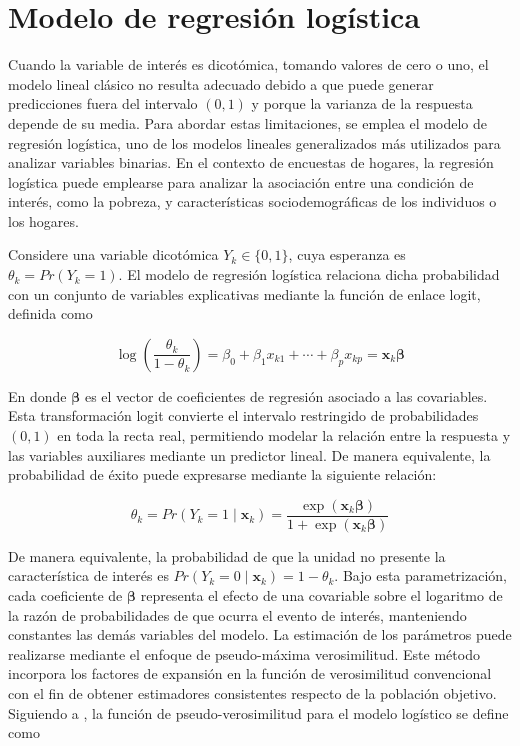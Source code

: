 \documentclass[
  spanish,
  12pt,
]{book}
\begin{document}
\section{Modelo de regresión logística}\label{sec-logistica}

Cuando la variable de interés es dicotómica, tomando valores de cero o uno, el modelo lineal clásico no resulta adecuado debido a que puede generar predicciones fuera del intervalo \((0,1)\) y porque la varianza de la respuesta depende de su media. Para abordar estas limitaciones, se emplea el modelo de regresión logística, uno de los modelos lineales generalizados más utilizados para analizar variables binarias. En el contexto de encuestas de hogares, la regresión logística puede emplearse para analizar la asociación entre una condición de interés, como la pobreza, y características sociodemográficas de los individuos o los hogares.

Considere una variable dicotómica \(Y_k \in \{0,1\}\), cuya esperanza es \(\theta_k=Pr(Y_k=1)\). El modelo de regresión logística relaciona dicha probabilidad con un conjunto de variables explicativas mediante la función de enlace logit, definida como

\[
\log\left(\frac{\theta_k}{1-\theta_k}\right)
=
\beta_0+\beta_1x_{k1}+\cdots+\beta_px_{kp}
=\mathbf{x}_{k}\boldsymbol{\beta}
\]

En donde \(\boldsymbol{\beta}\) es el vector de coeficientes de regresión asociado a las covariables. Esta transformación logit convierte el intervalo restringido de probabilidades \((0,1)\) en toda la recta real, permitiendo modelar la relación entre la respuesta y las variables auxiliares mediante un predictor lineal. De manera equivalente, la probabilidad de éxito puede expresarse mediante la siguiente relación:

\[
\theta_k
=
Pr(Y_k = 1 \mid \mathbf{x}_k)
=
\frac{\exp(\mathbf{x}_k\boldsymbol{\beta})}
     {1+\exp(\mathbf{x}_k\boldsymbol{\beta})}
\]

De manera equivalente, la probabilidad de que la unidad no presente la característica de interés es \(Pr(Y_k = 0 \mid \mathbf{x}_k) = 1-\theta_k\). Bajo esta parametrización, cada coeficiente de \(\boldsymbol{\beta}\) representa el efecto de una covariable sobre el logaritmo de la razón de probabilidades de que ocurra el evento de interés, manteniendo constantes las demás variables del modelo.
La estimación de los parámetros puede realizarse mediante el enfoque de pseudo-máxima verosimilitud. Este método incorpora los factores de expansión en la función de verosimilitud convencional con el fin de obtener estimadores consistentes respecto de la población objetivo. Siguiendo a \citet{heeringa2017applied}, la función de pseudo-verosimilitud para el modelo logístico se define como
\end{document}
